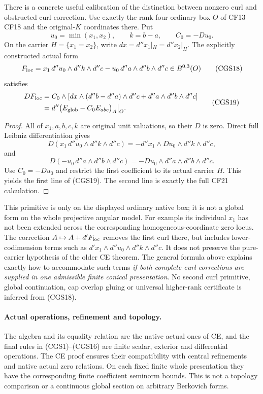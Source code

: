 There is a concrete useful calibration of the distinction
between nonzero curl and obstructed curl correction.  Use
exactly the rank-four ordinary box $O$ of CF13--CF18 and
the original-$K$ coordinates there.  Put
\[
            u_0=\min(x_1,x_2),\qquad k=b-a,
                        \qquad C_0=-Du_0.
 \tag{CGS17}
\]
On the carrier $H=\{x_1=x_2\}$, write
$dx=d''x_1|_H=d''x_2|_H$.  The explicitly constructed actual
form
\[
 F_{\rm loc}
   =x_1\,d''u_0\wedge d''k\wedge d''c
       -u_0\,d''a\wedge d''b\wedge d''c
                             \in B^{0,3}(O)
 \tag{CGS18}
\]
satisfies
\[
 \begin{split}
 DF_{\rm loc}
  &=C_0\wedge\left[
       dx\wedge(d''b-d''a)\wedge d''c
                     +d''a\wedge d''b\wedge d''c\right]\\
  &=d''\bigl(E_{\rm glob}-C_0E_{abc}\bigr)_A\big|_O.
 \end{split}
 \tag{CGS19}
\]

\begin{proof}
All of $x_1,a,b,c,k$ are original unit valuations, so their
$D$ is zero.  Direct full Leibniz differentiation gives
\[
 D(x_1\,d''u_0\wedge d''k\wedge d''c)
      =-d''x_1\wedge Du_0\wedge d''k\wedge d''c,
 \tag{CGS20}
\]
and
\[
 D(-u_0\,d''a\wedge d''b\wedge d''c)
      =-Du_0\wedge d''a\wedge d''b\wedge d''c.
 \tag{CGS21}
\]
Use $C_0=-Du_0$ and restrict the first coefficient to its
actual carrier $H$.  This yields the first line of (CGS19).
The second line is exactly the full CF21 calculation.
\end{proof}

This primitive is only on the displayed ordinary native box;
it is not a global form on the whole projective angular model.
For example its individual $x_1$ has not been extended across
the corresponding homogeneous-coordinate zero locus.
The correction $A\mapsto A+d'F_{\rm loc}$ removes the first
curl there, but includes lower-codimension terms such as
$d'x_1\wedge d''u_0\wedge d''k\wedge d''c$.  It does not
preserve the pure-carrier hypothesis of the older CE theorem.
The general formula above explains exactly how to accommodate
such terms \emph{if both complete curl corrections are supplied
in one admissible finite conical presentation}.  No second
curl primitive, global continuation, cap overlap gluing or
universal higher-rank certificate is inferred from (CGS18).

\paragraph{Actual operations, refinement and topology.}
The algebra and its equality relation are the native actual
ones of CE, and the final rules in (CGS1)--(CGS16) are finite
scalar, exterior and differential operations.  The CE proof
ensures their compatibility with central refinements and
native actual zero relations.  On each fixed finite whole
presentation they have the corresponding finite coefficient
seminorm bounds.  This is not a topology comparison or a
continuous global section on arbitrary Berkovich forms.


